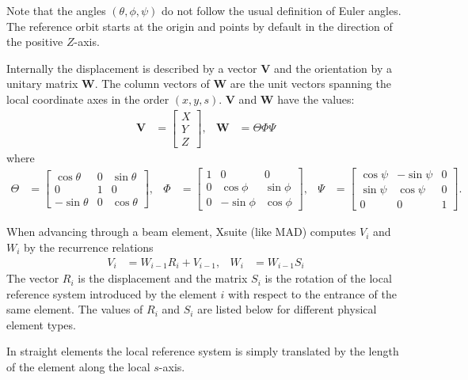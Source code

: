 Note that the angles $( \theta, \phi, \psi)$ do not follow the usual definition of Euler angles.
The reference orbit starts at the origin and
points by default in the direction of the positive $Z$-axis.

Internally the displacement is described by a vector $\mathbf{V}$ and the orientation by a unitary matrix
$\mathbf{W}$. The column vectors of $\mathbf{W}$ are the unit vectors spanning the local coordinate axes in the
order $( x, y, s )$. $\mathbf{V}$ and $\mathbf{W}$ have the values:
\begin{align}
  \mathbf{V} &=
    \begin{bmatrix}
      X\\
      Y\\
      Z
    \end{bmatrix},
  &
  \mathbf{W} &= \Theta \Phi \Psi
\end{align}
where
\begin{align}
  \Theta &=
    \begin{bmatrix}
      \cos\theta & 0 & \sin\theta\\
      0 & 1 & 0\\
      -\sin\theta & 0 & \cos\theta
    \end{bmatrix}, &
  \Phi &=
    \begin{bmatrix}
      1 & 0 & 0\\
      0 & \cos\phi & \sin\phi\\
      0 & -\sin\phi & \cos\phi
    \end{bmatrix}, &
  \Psi &=
    \begin{bmatrix}
      \cos\psi & -\sin\psi & 0\\
      \sin\psi & \cos\psi & 0\\
      0 & 0 & 1
    \end{bmatrix}.
\end{align}

When advancing
through a beam element, Xsuite (like MAD) computes $V_i$ and $W_i$ by the recurrence relations
\begin{align}
  V_i &= W_{i-1} R_i+V_{i-1}, &
  W_i &= W_{i-1} S_i
\end{align}
The vector $R_i$ is the displacement and the matrix $S_i$ is the rotation of the local reference
system introduced by the element $i$ with respect to the entrance of the same element. The
values of $R_i$ and $S_i$ are listed below for different physical element types.

In straight elements the local reference system is simply translated by the length of the element
along the local $s$-axis.

